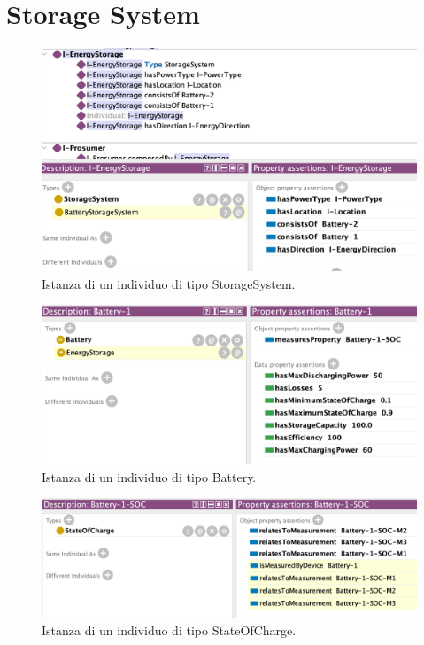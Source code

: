\section{Storage System}
\begin{figure}[H]
    \centering
    \includegraphics[width=12cm]{images/individual_storagesystem.png}
    \caption{Istanza di un individuo di tipo StorageSystem.}
    \label{fig:individual_storagesystem}
\end{figure}
\begin{figure}[H]
    \centering
    \includegraphics[width=12cm]{images/individual_bat1.png}
    \caption{Istanza di un individuo di tipo Battery.}
    \label{fig:individual_bat1}
\end{figure}
\begin{figure}[H]
    \centering
    \includegraphics[width=12cm]{images/individual-batterysoc.png}
    \caption{Istanza di un individuo di tipo StateOfCharge.}
    \label{fig:individual-batterysoc}
\end{figure}

